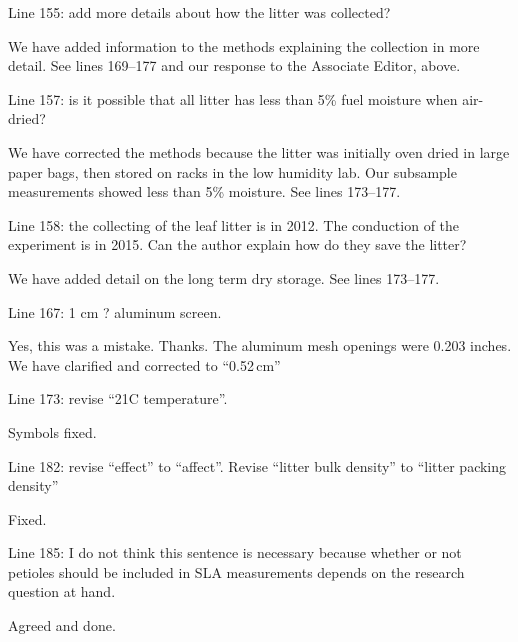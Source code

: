 \documentclass[letterpaper, 12pt]{letter}
\begin{document}
\begin{letter}{}
\begin{quoting}
  Line 155: add more details about how the litter was collected?
\end{quoting}

We have added information to the methods explaining the collection in more
detail. See lines 169--177 and our response to the Associate Editor, above.

\begin{quoting}
  Line 157: is it possible that all litter has less than 5\% fuel moisture when
  air-dried?
\end{quoting}

We have corrected the methods because the litter was initially oven dried in
large paper bags, then stored on racks in the low humidity lab. Our subsample
measurements showed less than 5\% moisture. See lines 173--177.

\begin{quoting}
  Line 158: the collecting of the leaf litter is in 2012. The conduction of the
  experiment is in 2015. Can the author explain how do they save the litter?
\end{quoting}

We have added detail on the long term dry storage. See lines 173--177.

\begin{quoting}
Line 167: 1 cm ? aluminum screen.
\end{quoting}

Yes, this was a mistake. Thanks. The aluminum mesh openings were 0.203 inches.
We have clarified and corrected to ``0.52\,cm''

\begin{quoting}
  Line 173: revise “21C temperature”.
\end{quoting}

Symbols fixed.

\begin{quoting}
  Line 182: revise “effect” to “affect”. Revise “litter bulk density” to
  “litter packing density”
\end{quoting}

Fixed.

\begin{quoting}
  Line 185: I do not think this sentence is necessary because whether or not
  petioles should be included in SLA measurements depends on the research
  question at hand.
\end{quoting}

Agreed and done.


\end{letter}
\end{document}
